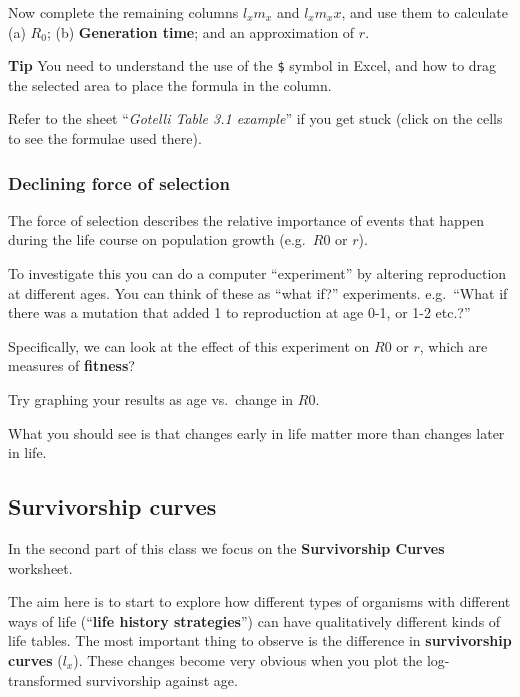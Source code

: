 \documentclass[
  a4paper]{book}
\begin{document}
Now complete the remaining columns \(l_x m_x\) and \(l_x m_x x\), and use them to calculate (a) \(R_0\); (b) \textbf{Generation time}; and an approximation of \(r\).

\textbf{Tip} You need to understand the use of the \texttt{\$} symbol in Excel, and how to drag the selected area to place the formula in the column.

Refer to the sheet ``\emph{Gotelli Table 3.1 example}'' if you get stuck (click on the cells to see the formulae used there).

\hypertarget{declining-force-of-selection}{%
\subsubsection{Declining force of selection}\label{declining-force-of-selection}}

The force of selection describes the relative importance of events that happen during the life course on population growth (e.g.~\(R0\) or \(r\)).

To investigate this you can do a computer ``experiment'' by altering reproduction at different ages. You can think of these as ``what if?'' experiments. e.g.~``What if there was a mutation that added 1 to reproduction at age 0-1, or 1-2 etc.?''

Specifically, we can look at the effect of this experiment on \(R0\) or \(r\), which are measures of \textbf{fitness}?

Try graphing your results as age vs.~change in \(R0\).

What you should see is that changes early in life matter more than changes later in life.

\hypertarget{survivorship-curves}{%
\subsection{Survivorship curves}\label{survivorship-curves}}

In the second part of this class we focus on the \textbf{Survivorship Curves} worksheet.

The aim here is to start to explore how different types of organisms with different ways of life (``\textbf{life history strategies}'') can have qualitatively different kinds of life tables. The most important thing to observe is the difference in \textbf{survivorship curves} (\(l_x\)). These changes become very obvious when you plot the log-transformed survivorship against age.
\end{document}
